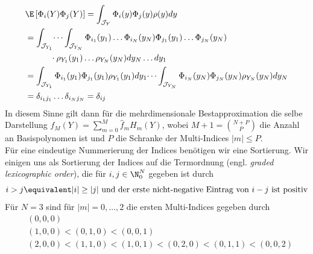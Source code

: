 \begin{equation}
\label{eqn:gpc_ortho_mv}
\begin{split}
&\E\left[\Phi_i(Y)\Phi_j(Y)\right]=\int_{\mathcal{J}_Y} \Phi_i(y)\Phi_j(y)\rho(y)dy\\
&=\int_{\mathcal{J}_{Y_1}}\dots\int_{\mathcal{J}_{Y_N}}\Phi_{i_1}(y_1)\dots\Phi_{i_N}(y_N)\Phi_{j_1}(y_1)\dots\Phi_{j_N}(y_N)\\
&\qquad\quad\cdot\rho_{Y_1}(y_1)\dots\rho_{Y_N}(y_N)dy_N\dots dy_1\\
&=\int_{\mathcal{J}_{Y_1}}\Phi_{i_1}(y_1)\Phi_{j_1}(y_1)\rho_{Y_1}(y_1)dy_1\dots\int_{\mathcal{J}_{Y_N}}\Phi_{i_N}(y_N)\Phi_{j_N}(y_N)\rho_{Y_N}(y_N)dy_N\\
&=\delta_{i_1j_1}\dots \delta_{i_Nj_N}=\delta_{ij}
\end{split}
\end{equation}
In diesem Sinne gilt dann für die mehrdimensionale Bestapproximation die selbe Darstellung $f_M(Y)=\sum_{m=0}^M\hat{f}_mH_m(Y)$, wobei $M+1=\binom{N+P}{P}$ die Anzahl an Basispolynomen ist und $P$ die Schranke der Multi-Indices $|m|\le P$.\\
Für eine eindeutige Nummerierung der Indices benötigen wir eine Sortierung. Wir einigen uns als Sortierung der Indices auf die Termordnung (engl. \emph{graded lexicographic order}), die für $i,j\in\N_0^N$ gegeben ist durch 
\[i>j \equivalent |i|\ge |j| \text{ und der erste nicht-negative Eintrag von } i-j \text { ist positiv}\]
Für $N=3$ sind für $|m|=0,\dots,2$ die ersten Multi-Indices gegeben durch
\begin{align*}
&(0,0,0)\\
&(1,0,0)<(0,1,0)<(0,0,1)\\
&(2,0,0)<(1,1,0)<(1,0,1)<(0,2,0)<(0,1,1)<(0,0,2)\\
\end{align*}
